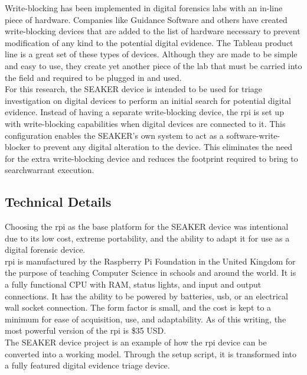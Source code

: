 \documentclass[12pt]{article}
\begin{document}
Write-blocking has been implemented in digital forensics labs with an in-line 
piece of hardware.  Companies like Guidance Software and others have created
write-blocking devices that are added to the list of hardware necessary to 
prevent modification of any kind to the potential digital evidence.  The Tableau
product line is a great set of these types of devices.  Although they are made
to be simple and easy to use, they create yet another piece of the lab that must
be carried into the field and required to be plugged in and used.\\

For this research, the SEAKER device is intended to be used for triage investigation
on digital devices to perform an initial search for potential digital evidence.
Instead of having a separate write-blocking device, the \gls{rpi} is set up with
write-blocking capabilities when digital devices are connected to it.  This
configuration enables the SEAKER's own system to act as a software-write-blocker
to prevent any digital alteration to the device.  This eliminates the need for 
the extra write-blocking device and reduces the footprint required to bring to
\gls{searchwarrant} execution.\\

\subsection{Technical Details}

Choosing the \gls{rpi} as the base platform for the SEAKER device was intentional
due to its low cost, extreme portability, and the ability to adapt it for use as
a digital forensic device.\\

\gls{rpi} is manufactured by the Raspberry Pi Foundation in the United Kingdom
for the purpose of teaching Computer Science in schools and around the world.  It
is a fully functional CPU with RAM, status lights, and input and output connections.
It has the ability
to be powered by batteries, \gls{usb}, or an electrical wall socket connection.
The form factor is small, and the cost is kept to a minimum for ease of
acquisition, use, and adaptability.  As of this writing,
the most powerful version of the \gls{rpi} is \$35 USD.\\

The SEAKER device project is an example of how the \gls{rpi} device
can be converted into a working model.  Through the setup script, it is 
transformed into a fully featured digital evidence triage device.\\
\end{document}
